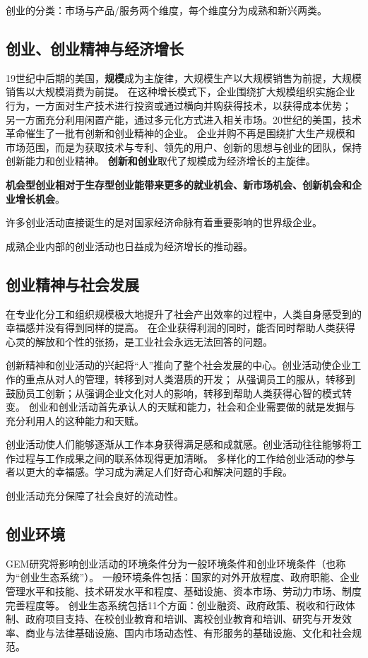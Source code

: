\documentclass[a4paper, UTF8]{ctexart}
\begin{document}
		创业的分类：市场与产品/服务两个维度，每个维度分为成熟和新兴两类。

	\subsection{创业、创业精神与经济增长}
		19世纪中后期的美国，\textbf{规模}成为主旋律，大规模生产以大规模销售为前提，大规模销售以大规模消费为前提。
		在这种增长模式下，企业围绕扩大规模组织实施企业行为，一方面对生产技术进行投资或通过横向并购获得技术，以获得成本优势；
		另一方面充分利用闲置产能，通过多元化方式进入相关市场。20世纪的美国，技术革命催生了一批有创新和创业精神的企业。
		企业并购不再是围绕扩大生产规模和市场范围，而是为获取技术与专利、领先的用户、创新的思想与创业的团队，保持创新能力和创业精神。
		\textbf{创新和创业}取代了规模成为经济增长的主旋律。
	
		\textbf{机会型创业相对于生存型创业能带来更多的就业机会、新市场机会、创新机会和企业增长机会}。

		许多创业活动直接诞生的是对国家经济命脉有着重要影响的世界级企业。

		成熟企业内部的创业活动也日益成为经济增长的推动器。

	\subsection{创业精神与社会发展}
		在专业化分工和组织规模极大地提升了社会产出效率的过程中，人类自身感受到的幸福感并没有得到同样的提高。
		在企业获得利润的同时，能否同时帮助人类获得心灵的解放和个性的张扬，是工业社会永远无法回答的问题。

		创新精神和创业活动的兴起将“人”推向了整个社会发展的中心。创业活动使企业工作的重点从对人的管理，转移到对人类潜质的开发；
		从强调员工的服从，转移到鼓励员工创新；从强调企业文化对人的影响，转移到帮助人类获得心智的模式转变。
		创业和创业活动首先承认人的天赋和能力，社会和企业需要做的就是发掘与充分利用人的这种能力和天赋。

		创业活动使人们能够逐渐从工作本身获得满足感和成就感。创业活动往往能够将工作过程与工作成果之间的联系体现得更加清晰。
		多样化的工作给创业活动的参与者以更大的幸福感。学习成为满足人们好奇心和解决问题的手段。

		创业活动充分保障了社会良好的流动性。

	\subsection{创业环境}
		GEM研究将影响创业活动的环境条件分为一般环境条件和创业环境条件（也称为“创业生态系统”）。
		一般环境条件包括：国家的对外开放程度、政府职能、企业管理水平和技能、技术研发水平和程度、基础设施、资本市场、劳动力市场、制度完善程度等。
		创业生态系统包括11个方面：创业融资、政府政策、税收和行政体制、政府项目支持、在校创业教育和培训、离校创业教育和培训、研究与开发效率、商业与法律基础设施、国内市场动态性、有形服务的基础设施、文化和社会规范。
\end{document}
